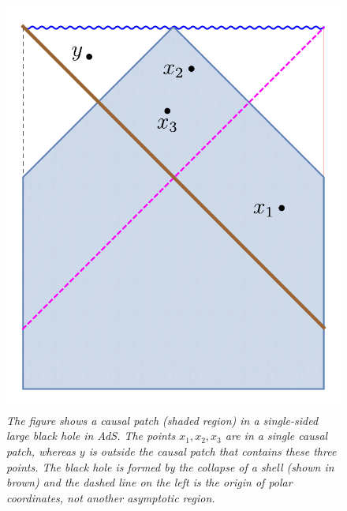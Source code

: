 \documentclass[12pt]{article}
\begin{document}
\begin{figure}[!ht]
\begin{center}
\includegraphics[height=0.5\textheight]{causalpatch.pdf}
\caption{\em The figure shows a causal patch (shaded region) in a single-sided large black hole in AdS. The points $x_1, x_2, x_3$ are in a single causal patch, whereas $y$ is outside the causal patch that contains these three points.  The black hole is formed by the collapse of a shell (shown in brown) and the dashed line on the left is the origin of polar coordinates, not another asymptotic region. \label{causalpatch}}
\end{center}
\end{figure}
\end{document}
